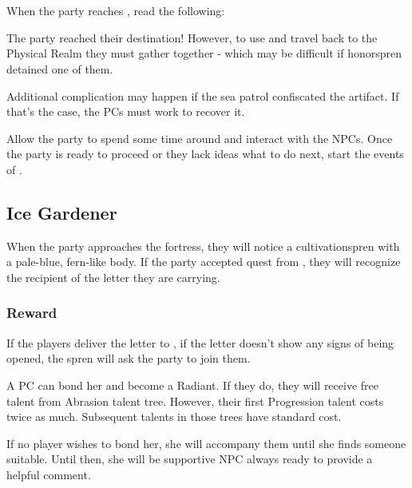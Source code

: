 \section{\locationFidelity{}}
\label{sec:unyieldingFidelity}

When the party reaches \locationFidelity{}, read the following:


The party reached their destination! However, to use \lootGateOpener{} and travel back to the Physical Realm they must gather together - which may be difficult if honorspren detained one of them.

Additional complication may happen if the sea patrol confiscated the artifact. If that's the case, the PCs must work to recover it.

Allow the party to spend some time around and interact with the NPCs. Once the party is ready to proceed or they lack ideas what to do next, start the events of .

\newpage
\subsection{Ice Gardener}

When the party approaches the fortress, they will notice a cultivationspren with a pale-blue, fern-like body. If the party accepted quest from , they will recognize the recipient of the letter they are carrying.

\subsubsection{Reward}

If the players deliver the letter to \npcIceCultivationsprenGardener{}, if the letter doesn't show any signs of being opened, the spren will ask the party to join them.

A PC can bond her and become a Radiant. If they do, they will receive free talent from Abrasion talent tree. However, their first Progression talent costs twice as much. Subsequent talents in those trees have standard cost.

If no player wishes to bond her, she will accompany them until she finds someone suitable. Until then, she will be supportive NPC always ready to provide a helpful comment.

